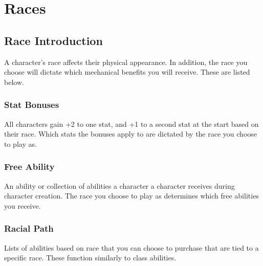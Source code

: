 \chapter{Races}
\begin{multicols}{2}
\section{Race Introduction}
A character’s race affects their physical appearance. In addition, the race you choose will dictate which mechanical benefits you will receive. These are listed below.
\subsection{Stat Bonuses}
All characters gain +2 to one stat, and +1 to a second stat at the start based on their race. Which stats the bonuses apply to are dictated by the race you choose to play as.
\subsection{Free Ability}
An ability or collection of abilities a character a character receives during character creation. The race you choose to play as determines which free abilities you receive.
\subsection{Racial Path}
Lists of abilities based on race that you can choose to purchase that are tied to a specific race. These function similarly to class abilities.
\end{multicols}
